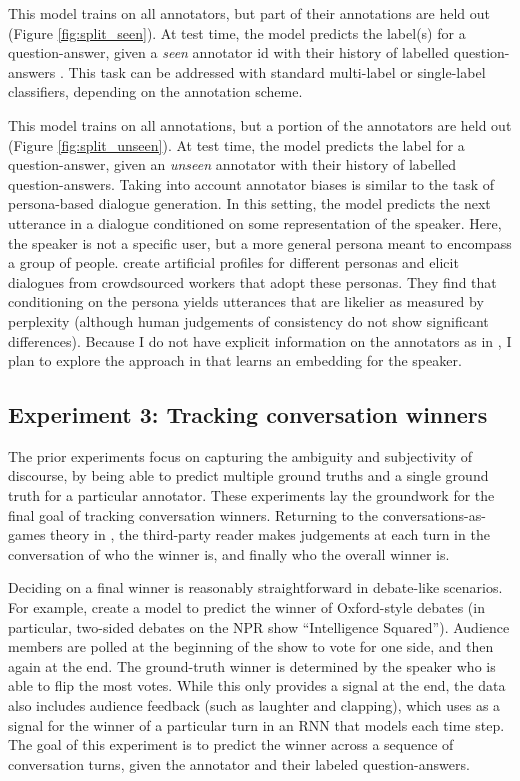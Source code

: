  This model trains on all annotators, but part of their annotations are held out (Figure \ref{fig:split_seen}). At test time, the model predicts the label(s) for a question-answer, given a \emph{seen} annotator id with their history of labelled question-answers . This task can be addressed with standard multi-label or single-label classifiers, depending on the annotation scheme.

 This model trains on all annotations, but a portion of the annotators are held out (Figure \ref{fig:split_unseen}). At test time, the model predicts the label for a question-answer, given an \emph{unseen} annotator with their history of labelled question-answers. Taking into account annotator biases is similar to the task of persona-based dialogue generation. In this setting, the model predicts the next utterance in a dialogue conditioned on some representation of the speaker. Here, the speaker is not a specific user, but a more general persona meant to encompass a group of people. \citet{Zhang:2018} create artificial profiles for different personas and elicit dialogues from crowdsourced workers that adopt these personas. They find that conditioning on the persona yields utterances that are likelier as measured by perplexity (although human judgements of consistency do not show significant differences). Because I do not have explicit information on the annotators as in \citet{Zhang:2018}, I plan to explore the approach in \citet{Li:2016} that learns an embedding for the speaker.

\subsection{Experiment 3: Tracking conversation winners} 
The prior experiments focus on capturing the ambiguity and subjectivity of discourse, by being able to predict multiple ground truths and a single ground truth for a particular annotator. These experiments lay the groundwork for the final goal of tracking conversation winners. Returning to the conversations-as-games theory in \citet{Asher:2018}, the third-party reader makes judgements at each turn in the conversation of who the winner is, and finally who the overall winner is. 

Deciding on a final winner is reasonably straightforward in debate-like scenarios. For example, \citet{Zhang:2016} create a model to predict the winner of Oxford-style debates (in particular, two-sided debates on the NPR show ``Intelligence Squared''). Audience members are polled at the beginning of the show to vote for one side, and then again at the end. The ground-truth winner is determined by the speaker who is able to flip the most votes. While this only provides a signal at the end, the data also includes audience feedback (such as laughter and clapping), which \citet{Potash:2017} uses as a signal for the winner of a particular turn in an RNN that models each time step.  
The goal of this experiment is to predict the winner across a sequence of conversation turns, given the annotator and their labeled question-answers.


